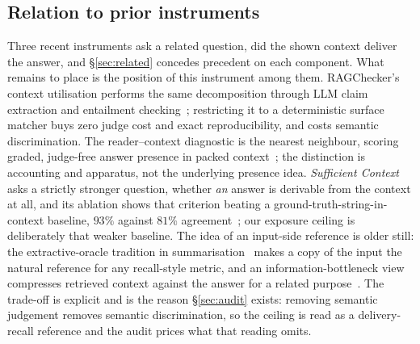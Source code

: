 \documentclass[10pt,twocolumn]{article}
\begin{document}
\subsection{Relation to prior instruments}\label{sec:ceiling-prior}
Three recent instruments ask a related question, did the shown context deliver the answer, and \S\ref{sec:related} concedes precedent on each component. What remains to place is the position of this instrument among them. RAGChecker's context utilisation performs the same decomposition through LLM claim extraction and entailment checking~\cite{ragchecker2024}; restricting it to a deterministic surface matcher buys zero judge cost and exact reproducibility, and costs semantic discrimination. The reader--context diagnostic is the nearest neighbour, scoring graded, judge-free answer presence in packed context~\cite{readercontext2026}; the distinction is accounting and apparatus, not the underlying presence idea. \emph{Sufficient Context} asks a strictly stronger question, whether \emph{an} answer is derivable from the context at all, and its ablation shows that criterion beating a ground-truth-string-in-context baseline, $93\%$ against $81\%$ agreement~\cite{sufficientcontext2025}; our exposure ceiling is deliberately that weaker baseline. The idea of an input-side reference is older still: the extractive-oracle tradition in summarisation~\cite{see2017pointergenerator,narayan2018xsum,xu2019extractive} makes a copy of the input the natural reference for any recall-style metric, and an information-bottleneck view compresses retrieved context against the answer for a related purpose~\cite{zhu2024ibrag}. The trade-off is explicit and is the reason \S\ref{sec:audit} exists: removing semantic judgement removes semantic discrimination, so the ceiling is read as a delivery-recall reference and the audit prices what that reading omits.
\end{document}
